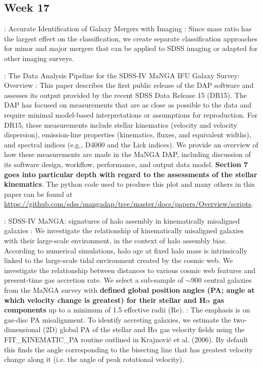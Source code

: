 \documentclass[ceqn,usenatbib,onecolumn]{mnras}
\begin{document}
\subsection{Week 17}
\par \citet{2019ApJ...872...76N} : {Accurate Identification of Galaxy Mergers with Imaging} : Since mass ratio has the largest effect on the classification, we create separate classification approaches for minor and major mergers that can be applied to SDSS imaging or adapted for other imaging surveys.
\par \citet{2019arXiv190100856W} : {The Data Analysis Pipeline for the SDSS-IV MaNGA IFU Galaxy Survey: Overview} : This paper describes the first public release of the DAP software and assesses its output provided by the recent SDSS Data Release 15 (DR15). The DAP has focused on measurements that are as close as possible to the data and require minimal model-based interpretations or assumptions for reproduction. For DR15, these measurements include stellar kinematics (velocity and velocity dispersion), emission-line properties (kinematics, fluxes, and equivalent widths), and spectral indices (e.g., D4000 and the Lick indices). We provide an overview of how these measurements are made in the MaNGA DAP, including discussion of its software design, workflow, performance, and output data model. \textbf{Section 7 goes into particular depth with regard to the assessments of the
stellar kinematics}. The python code used to produce this plot and many others
in this paper can be found at \url{https://github.com/sdss/mangadap/tree/master/docs/papers/Overview/scripts}.
\par \citet{2019MNRAS.483..172D} : {SDSS-IV MaNGA: signatures of halo assembly in kinematically misaligned galaxies} : We investigate the relationship of kinematically misaligned galaxies with their large-scale environment, in the context of halo assembly bias. According to numerical simulations, halo age at fixed halo mass is intrinsically linked to the large-scale tidal environment created by the cosmic web. We investigate the relationship between distances to various cosmic web features and present-time gas accretion rate. We select a sub-sample of $\sim$900 central galaxies from the MaNGA survey with \textbf{defined global position angles (PA; angle at which velocity change is greatest) for their stellar and H$\alpha$ gas components} up to a minimum of 1.5 effective radii (Re). : The emphasis is on gas-disc PA misalignment. To identify accreting galaxies, we estimate the two-dimensional (2D) global PA of the stellar and H$\alpha$ gas velocity fields using the FIT\_KINEMATIC\_PA routine outlined in Krajnović et al. (2006). By default this finds the angle corresponding to the bisecting line that has greatest velocity change along it (i.e. the angle of peak rotational velocity). 
\end{document}
